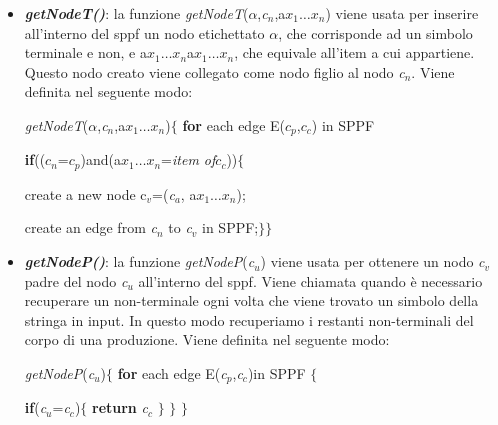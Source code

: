 \begin{itemize}
	\item \textbf{\textit{getNodeT()}}: la funzione \textit{getNodeT}($\alpha$,\textit{c}$_n$,a$x_1\dots x_n$) viene usata per inserire all'interno del sppf un nodo etichettato $\alpha$, che corrisponde ad un simbolo terminale e non, e a$x_1\dots x_n$a$x_1\dots x_n$, che equivale all'item a cui appartiene. Questo nodo creato viene collegato come nodo figlio al nodo \textit{c}$_n$. Viene definita nel seguente modo:\par
	\hspace{0.5cm}\textit{getNodeT}($\alpha$,\textit{c}$_n$,a$x_1\dots x_n$)$\{$ \textbf{for} each edge E($c_p$,$c_c$) in SPPF\par \hspace{5.5cm}\textbf{if}(($c_n$=$c_p$)and(a$x_1\dots x_n$=\textit{item of}$c_c$))$\{$ \par \hspace{5.5cm}create a new node c$_v$=(\textit{c}$_a$, a$x_1\dots x_n$);  \par 
	 \hspace{5.5cm}create an edge from \textit{c}$_n$ to \textit{c}$_v$ in SPPF;$\}\}$
	 \item \textbf{\textit{getNodeP()}}: la funzione \textit{getNodeP}(\textit{c}$_u$) viene usata per ottenere un nodo \textit{c}$_v$ padre del nodo \textit{c}$_u$ all'interno del sppf. Viene chiamata quando è necessario recuperare un non-terminale ogni volta che viene trovato un simbolo della stringa in input. In questo modo recuperiamo i restanti non-terminali del corpo di una produzione. Viene definita nel seguente modo:\par
	 \hspace{1.5cm}\textit{getNodeP}(\textit{c}$_u$)$\{$ \textbf{for} each edge E(\textit{c}$_p$,\textit{c}$_c$)in SPPF $\{$  \par 
	 \hspace{4.4cm}\textbf{if}(\textit{c}$_u$=\textit{c}$_c$)$\{$ \textbf{return} \textit{c}$_c$ $\}$ $\}$ $\}$
\end{itemize}
